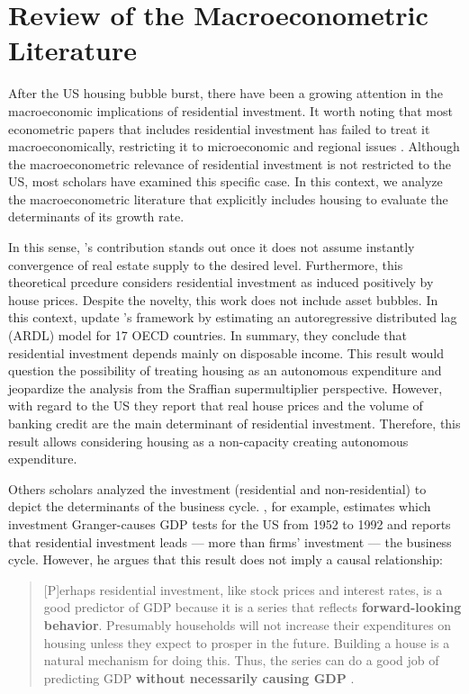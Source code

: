 \documentclass[12pt, a4]{article}
\begin{document}
\section{Review of the Macroeconometric Literature}
\label{sec:org43f9611}
\label{sec:empirical_review}
After the US housing bubble burst, there have been a growing attention in the macroeconomic implications of residential investment.
It worth noting that most econometric papers that includes residential investment has failed to treat it macroeconomically, restricting it to microeconomic and regional issues \cite{arestis_u.s._2008}.
Although the macroeconometric relevance of residential investment is not restricted to the US, most scholars have examined this specific case.
In this context, we analyze the macroeconometric literature that explicitly includes housing to evaluate the determinants of its growth rate.

In this sense, 's \citeyear{poterba_tax_1984} contribution stands out once it does not assume instantly convergence of real estate supply to the desired level.
Furthermore, this theoretical prcedure considers residential investment as induced positively by house prices.
Despite the novelty, this work does not include asset bubbles.
In this context,  \textcite{arestis_residential_2015} update \citeauthor*{poterba_tax_1984}'s \citeyear{poterba_tax_1984} framework by estimating an autoregressive distributed lag (ARDL) model for 17 OECD countries.
In summary, they conclude that residential investment depends mainly on disposable income.
This result would  question the possibility of treating housing as an autonomous expenditure and jeopardize the analysis from the Sraffian supermultiplier perspective.
However, with regard to the US they report that real house prices and the volume of banking credit are the main determinant of residential investment.
Therefore, this result allows considering housing as a non-capacity creating autonomous expenditure.

Others scholars analyzed the investment (residential and non-residential) to depict the determinants of the business cycle.
\textcite{green_follow_1997}, for example, estimates which investment Granger-causes GDP tests for the US from 1952 to 1992 and reports that residential investment leads --- more than firms' investment --- the business cycle.
However, he argues that this result does not imply a causal relationship: 

\begin{quote}
[P]erhaps residential investment, like stock prices and interest rates, is a good predictor of GDP because it is a series that reflects \textbf{forward-looking behavior}. Presumably households will not increase their expenditures on housing unless they expect to prosper in the future. Building a house is a natural mechanism for doing this. Thus, the series can do a good job of predicting GDP \textbf{without necessarily causing GDP} \cite[p.~267, ephasis added]{green_follow_1997}.
\end{quote}
\end{document}
